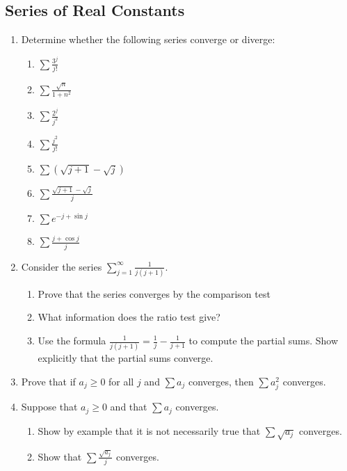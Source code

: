 \documentclass{article}
\begin{document}
\subsection{Series of Real Constants}
\begin{enumerate}
      \item Determine whether the following series converge
            or diverge:
            \begin{enumerate}
                  \item $\sum\frac{3^j}{j!}$
                  \item $\sum\frac{\sqrt{n}}{1+n^2}$
                  \item $\sum\frac{2^j}{j^2}$
                  \item $\sum\frac{j^2}{j!}$
                  \item $\sum(\sqrt{j+1}-\sqrt{j})$
                  \item $\sum\frac{\sqrt{j+1}-\sqrt{j}}{j}$
                  \item $\sum e^{-j+\sin j}$
                  \item $\sum\frac{j+\cos j}{j}$
            \end{enumerate}
            \setcounter{enumi}{3}
      \item Consider the series $\sum_{j=1}^\infty\frac{1}{j(j+1)}$.
            \begin{enumerate}
                  \item Prove that the series converges by the
                        comparison test
                  \item What information does the ratio test give?
                  \item Use the formula $\frac{1}{j(j+1)}=\frac{1}{j}-\frac{1}{j+1}$
                        to compute the partial sums. Show explicitly that
                        the partial sums converge.
            \end{enumerate}
            \setcounter{enumi}{12}
      \item Prove that if $a_j\geq 0$ for all $j$ and $\sum a_j$
            converges, then $\sum a_j^2$ converges.
      \item Suppose that $a_j\geq 0$ and that $\sum a_j$ converges.
            \begin{enumerate}
                  \item Show by example that it is not necessarily true that
                        $\sum\sqrt{a_j}$ converges.
                  \item Show that $\sum\frac{\sqrt{a_j}}{j}$ converges.
            \end{enumerate}
\end{enumerate}
\end{document}
